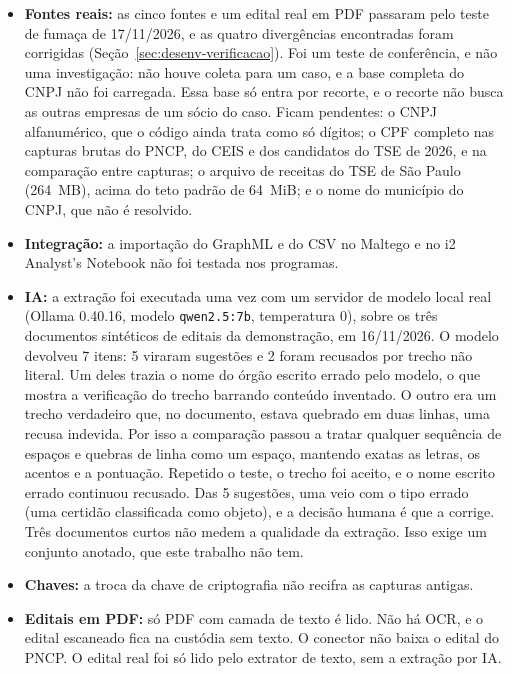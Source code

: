 \begin{itemize}
	\item \textbf{Fontes reais:} as cinco fontes e um edital real em PDF
	passaram pelo teste de fumaça de 17/11/2026, e as quatro divergências
	encontradas foram corrigidas (Seção~\ref{sec:desenv-verificacao}). Foi um
	teste de conferência, e não uma investigação: não houve coleta para um
	caso, e a base completa do CNPJ não foi carregada. Essa base só entra por
	recorte, e o recorte não busca as outras empresas de um sócio do caso.
	Ficam pendentes: o CNPJ alfanumérico, que o código ainda trata como só
	dígitos; o CPF completo nas capturas brutas do PNCP, do CEIS e dos
	candidatos do TSE de 2026, e na comparação entre capturas; o arquivo de
	receitas do TSE de São Paulo (264~MB), acima do teto padrão de 64~MiB; e
	o nome do município do CNPJ, que não é resolvido.
	\item \textbf{Integração:} a importação do GraphML e do CSV no Maltego e no
	i2 Analyst's Notebook não foi testada nos programas.
	\item \textbf{IA:} a extração foi executada uma vez com um servidor de
	modelo local real (Ollama 0.40.16, modelo \texttt{qwen2.5:7b}, temperatura
	0), sobre os três documentos sintéticos de editais da demonstração, em
	16/11/2026. O modelo devolveu 7 itens: 5 viraram sugestões e 2 foram
	recusados por trecho não literal. Um deles trazia o nome do órgão escrito
	errado pelo modelo, o que mostra a verificação do trecho barrando conteúdo
	inventado. O outro era um trecho verdadeiro que, no documento, estava
	quebrado em duas linhas, uma recusa indevida. Por isso a comparação passou
	a tratar qualquer sequência de espaços e quebras de linha como um espaço,
	mantendo exatas as letras, os acentos e a pontuação. Repetido o teste, o
	trecho foi aceito, e o nome escrito errado continuou recusado. Das 5
	sugestões, uma veio com
	o tipo errado (uma certidão classificada como objeto), e a decisão humana
	é que a corrige. Três documentos curtos não medem a qualidade da extração.
	Isso exige um conjunto anotado, que este trabalho não tem.
	\item \textbf{Chaves:} a troca da chave de criptografia não recifra as
	capturas antigas.
	\item \textbf{Editais em PDF:} só PDF com camada de texto é lido. Não há
	OCR, e o edital escaneado fica na custódia sem texto. O conector não
	baixa o edital do PNCP. O edital real foi só lido pelo extrator de texto,
	sem a extração por IA.

\end{itemize}
